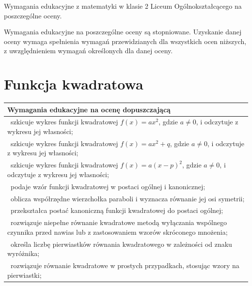 \documentclass[12pt,a4paper]{article}
\begin{document}
	
	\begin{center}
		\Large Wymagania edukacyjne z matematyki w klasie 2 Liceum Ogólnokształcącego na poszczególne oceny.
	\end{center}
	
	Wymagania edukacyjne na poszczególne oceny są stopniowane.
	Uzyskanie danej oceny wymaga spełnienia wymagań przewidzianych
	dla wszystkich ocen niższych, z uwzględnieniem wymagań
	określonych dla danej oceny.
	
	\section{Funkcja kwadratowa}
	
	\begin{longtable}{|p{16cm}|}
		\hline
		
		\textbf{Wymagania edukacyjne na ocenę dopuszczającą} \\ \hline
		
		\textbullet\ szkicuje wykres funkcji kwadratowej $f(x)=ax^2$, gdzie $a\neq 0$, i odczytuje z wykresu jej własności; \\
		
		\textbullet\ szkicuje wykres funkcji kwadratowej $f(x)=ax^2+q$, gdzie $a\neq 0$, i odczytuje z wykresu jej własności; \\
		
		\textbullet\ szkicuje wykres funkcji kwadratowej $f(x)=a(x-p)^2$, gdzie $a\neq 0$, i odczytuje z wykresu jej własności; \\
		
		\textbullet\ podaje wzór funkcji kwadratowej w postaci ogólnej i kanonicznej; \\
		
		\textbullet\ oblicza współrzędne wierzchołka paraboli i wyznacza równanie jej osi symetrii; \\
		
		\textbullet\ przekształca postać kanoniczną funkcji kwadratowej do postaci ogólnej; \\
		
		\textbullet\ rozwiązuje niepełne równanie kwadratowe metodą wyłączania wspólnego czynnika przed nawias lub z zastosowaniem wzorów skróconego mnożenia; \\
		
		\textbullet\ określa liczbę pierwiastków równania kwadratowego w zależności od znaku wyróżnika; \\
		
		\textbullet\ rozwiązuje równanie kwadratowe w prostych przypadkach, stosując wzory na pierwiastki; \\
		

\end{longtable}
\end{document}
